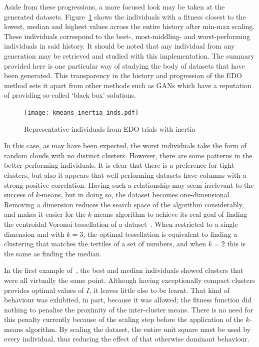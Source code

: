 Aside from these progressions, a more focused look may be taken at the generated
datasets. Figure~\ref{fig:kmeans_inertia_inds} shows the individuals with a
fitness closest to the lowest, median and highest values across the entire
history after min-max scaling. These individuals correspond to the best-,
most-middling- and worst-performing individuals in said history. It should be
noted that any individual from any generation may be retrieved and studied with
this implementation. The summary provided here is one particular way of studying
the body of datasets that have been generated. This transparency in the history
and progression of the EDO method sets it apart from other methods such as GANs
which have a reputation of providing so-called `black box' solutions.

\begin{figure}
    \centering
    \texttt{[image: kmeans\_inertia\_inds.pdf]}
    \caption{%
        Representative individuals from EDO trials with inertia
    }\label{fig:kmeans_inertia_inds}
\end{figure}

In this case, as may have been expected, the worst individuals take the form of
random clouds with no distinct clusters. However, there are some patterns in the
better-performing individuals. It is clear that there is a preference for tight
clusters, but also it appears that well-performing datasets have columns with a
strong positive correlation. Having such a relationship may seem irrelevant to
the success of \(k\)-means, but in doing so, the dataset becomes
one-dimensional. Removing a dimension reduces the search space of the algorithm
considerably, and makes it easier for the \(k\)-means algorithm to achieve its
real goal of finding the centroidal Voronoi tessellation of a
dataset~\cite{Du2006}. When restricted to a single dimension and with \(k = 3\),
the optimal tessellation is equivalent to finding a clustering that matches the
tertiles of a set of numbers, and when \(k = 2\) this is the same as finding the
median.


In the first example of~\cite{Wilde2020:edo}, the best and median individuals
showed clusters that were all virtually the same point. Although having
exceptionally compact clusters provides optimal values of \(I\), it leaves
little else to be learnt. That kind of behaviour was exhibited, in part, because
it was allowed; the fitness function did nothing to penalise the proximity of
the inter-cluster means. There is no need for this penalty currently because of
the scaling step before the application of the \(k\)-means algorithm. By scaling
the dataset, the entire unit square must be used by every individual, thus
reducing the effect of that otherwise dominant behaviour.


